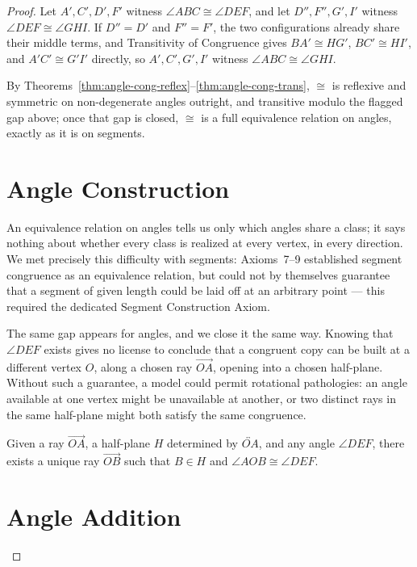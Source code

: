 \documentclass[../../../main/main.tex]{subfiles}
\begin{document}
\begin{proof}
Let $A', C', D', F'$ witness $\angle ABC \cong \angle DEF$, and let $D'', F'', G', I'$ witness $\angle DEF \cong \angle GHI$. If $D'' = D'$ and $F'' = F'$, the two configurations already share their middle terms, and Transitivity of Congruence gives $BA' \cong HG'$, $BC' \cong HI'$, and $A'C' \cong G'I'$ directly, so $A', C', G', I'$ witness $\angle ABC \cong \angle GHI$.

By Theorems~\ref{thm:angle-cong-reflex}--\ref{thm:angle-cong-trans}, $\cong$ is reflexive and symmetric on non-degenerate angles outright, and transitive modulo the flagged gap above; once that gap is closed, $\cong$ is a full equivalence relation on angles, exactly as it is on segments.

\section{Angle Construction}

An equivalence relation on angles tells us only which angles share a class; it says nothing about whether every class is realized at every vertex, in every direction. We met precisely this difficulty with segments: Axioms~7--9 established segment congruence as an equivalence relation, but could not by themselves guarantee that a segment of given length could be laid off at an arbitrary point --- this required the dedicated Segment Construction Axiom.

The same gap appears for angles, and we close it the same way. Knowing that $\angle DEF$ exists gives no license to conclude that a congruent copy can be built at a different vertex $O$, along a chosen ray $\overrightarrow{OA}$, opening into a chosen half-plane. Without such a guarantee, a model could permit rotational pathologies: an angle available at one vertex might be unavailable at another, or two distinct rays in the same half-plane might both satisfy the same congruence.

\begin{axiom}\label{ax:angle-construction}
Given a ray $\overrightarrow{OA}$, a half-plane $H$ determined by $\overleftrightarrow{OA}$, and any angle $\angle DEF$, there exists a unique ray $\overrightarrow{OB}$ such that $B \in H$ and $\angle AOB \cong \angle DEF$.
\end{axiom}

\section{Angle Addition}


\end{proof}
\end{document}
